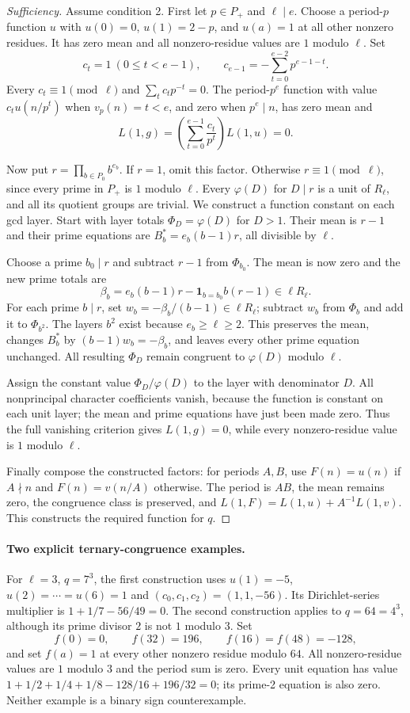\documentclass[11pt]{amsart}
\theoremstyle{definition}
\theoremstyle{remark}
\numberwithin{equation}{section}
\begin{document}
\begin{proof}[Sufficiency]
Assume condition 2. First let $p\in P_+$ and $\ell\mid e$.
Choose a period-$p$ function $u$ with $u(0)=0$, $u(1)=2-p$, and
$u(a)=1$ at all other nonzero residues. It has zero mean and all
nonzero-residue values are $1$ modulo $\ell$. Set
\[
 c_t=1\ (0\leq t<e-1),\qquad
 c_{e-1}=-\sum_{t=0}^{e-2}p^{e-1-t}.
\]
Every $c_t\equiv1\pmod\ell$ and $\sum_tc_tp^{-t}=0$.
The period-$p^e$ function with value $c_tu(n/p^t)$ when $v_p(n)=t<e$,
and zero when $p^e\mid n$, has zero mean and
\[
 L(1,g)=\left(\sum_{t=0}^{e-1}\frac{c_t}{p^t}\right)L(1,u)=0.
\]

Now put $r=\prod_{b\in P_0}b^{e_b}$. If $r=1$, omit this factor.
Otherwise $r\equiv1\pmod\ell$, since every prime in $P_+$ is
$1$ modulo $\ell$. Every $\varphi(D)$ for $D\mid r$ is a unit of
$R_\ell$, and all its quotient groups are trivial. We construct a
function constant on each gcd layer. Start with layer totals
$\Phi_D=\varphi(D)$ for $D>1$. Their mean is $r-1$ and their
prime equations are $B_b^*=e_b(b-1)r$, all divisible by $\ell$.

Choose a prime $b_0\mid r$ and subtract $r-1$ from $\Phi_{b_0}$.
The mean is now zero and the new prime totals are
\[
 \beta_b=e_b(b-1)r-\mathbf1_{b=b_0}b(r-1)\in\ell R_\ell.
\]
For each prime $b\mid r$, set $w_b=-\beta_b/(b-1)\in\ell R_\ell$;
subtract $w_b$ from $\Phi_b$ and add it to $\Phi_{b^2}$.
The layers $b^2$ exist because $e_b\geq\ell\geq2$.
This preserves the mean, changes $B_b^*$ by $(b-1)w_b=-\beta_b$,
and leaves every other prime equation unchanged. All resulting
$\Phi_D$ remain congruent to $\varphi(D)$ modulo $\ell$.

Assign the constant value $\Phi_D/\varphi(D)$ to the layer with
denominator $D$. All nonprincipal character coefficients vanish,
because the function is constant on each unit layer; the mean and
prime equations have just been made zero. Thus the full vanishing
criterion gives $L(1,g)=0$, while every nonzero-residue value is
$1$ modulo $\ell$.

Finally compose the constructed factors: for periods $A,B$, use
$F(n)=u(n)$ if $A\nmid n$ and $F(n)=v(n/A)$ otherwise.
The period is $AB$, the mean remains zero, the congruence class is
preserved, and
$L(1,F)=L(1,u)+A^{-1}L(1,v)$. This constructs the required function
for $q$.
\end{proof}

\paragraph{Two explicit ternary-congruence examples.}
For $\ell=3$, $q=7^3$, the first construction uses
$u(1)=-5$, $u(2)=\cdots=u(6)=1$ and $(c_0,c_1,c_2)=(1,1,-56)$.
Its Dirichlet-series multiplier is $1+1/7-56/49=0$.
The second construction applies to $q=64=4^3$, although its prime
divisor $2$ is not $1$ modulo $3$. Set
\[
 f(0)=0,\qquad f(32)=196,\qquad f(16)=f(48)=-128,
\]
and set $f(a)=1$ at every other nonzero residue modulo $64$.
All nonzero-residue values are $1$ modulo $3$ and the period sum is zero. Every
unit equation has value
$1+1/2+1/4+1/8-128/16+196/32=0$; its prime-2 equation is also zero.
Neither example is a binary sign counterexample.
\end{document}
